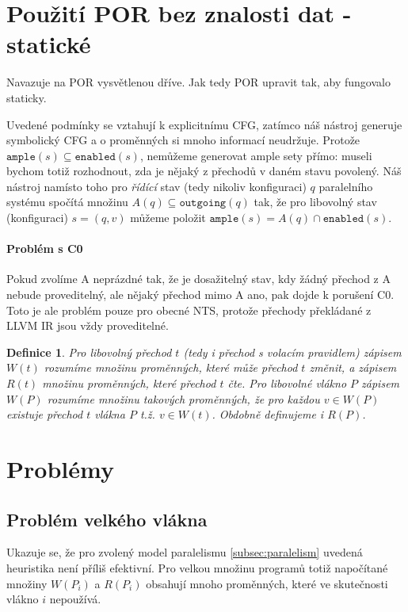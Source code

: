 \documentclass[10pt,a4paper,notitlepage]{report}
\newtheorem{definition}{Definice}
\begin{document}
\section{Použití POR bez znalosti dat - statické}
Navazuje na POR vysvětlenou dříve. Jak tedy POR upravit tak, aby fungovalo staticky.


Uvedené podmínky se vztahují k explicitnímu CFG, zatímco náš nástroj generuje symbolický CFG a o proměnných si mnoho informací neudržuje. Protože $\texttt{ample}(s) \subseteq \texttt{enabled}(s)$, nemůžeme generovat ample sety přímo: museli bychom totiž rozhodnout, zda je nějaký z přechodů v daném stavu povolený. Náš nástroj namísto toho pro \textit{řídící} stav (tedy nikoliv konfiguraci) $q$ paralelního systému spočítá množinu $A(q) \subseteq \texttt{outgoing}(q)$ tak, že pro libovolný stav (konfiguraci) $s = (q, v)$ můžeme položit $\texttt{ample}(s) = A(q) \cap \texttt{enabled}(s)$.

\paragraph{Problém s C0}
Pokud zvolíme A neprázdné tak, že je dosažitelný stav, kdy žádný přechod z A nebude proveditelný, ale nějaký přechod mimo A ano, pak dojde k porušení C0. Toto je ale problém pouze pro obecné NTS, protože přechody překládané z LLVM IR jsou vždy proveditelné. 



\begin{definition}
Pro libovolný přechod $t$ (tedy i přechod s volacím pravidlem) zápisem $W(t)$ rozumíme množinu proměnných, které může přechod $t$ změnit, a zápisem $R(t)$ množinu proměnných, které přechod $t$ čte. Pro libovolné vlákno $P$ zápisem $W(P)$ rozumíme množinu takových proměnných, že pro každou $v \in W(P)$ existuje přechod $t$ vlákna $P$ t.ž. $v \in W(t)$. Obdobně definujeme i $R(P)$.
\end{definition}

\section{Problémy}

\subsection{Problém velkého vlákna}
Ukazuje se, že pro zvolený model paralelismu \ref{subsec:paralelism} uvedená heuristika není příliš efektivní. Pro velkou množinu programů  totiž napočítané množiny $W(P_i)$ a $R(P_i)$ obsahují mnoho proměnných, které ve skutečnosti vlákno $i$ nepoužívá.
\end{document}
